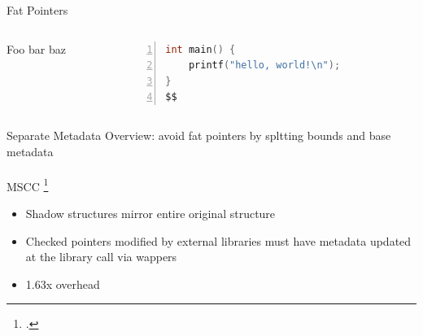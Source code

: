 \documentclass[aspectratio=169]{beamer}
\begin{document}
\begin{frame}[fragile]{Fat Pointers}
  \footnotesize
  \begin{columns}[T]
    \begin{column}{0.45\textwidth}
        Foo bar baz
    \end{column}
    \begin{column}{0.45\textwidth}
%      
       \begin{lstlisting}[language=C,numbers=left,mathescape,basicstyle={\footnotesize\ttfamily}]
int main() {
    printf("hello, world!\n");
}
$$
        \end{lstlisting}
    \end{column}
  \end{columns}
\end{frame}


\begin{frame}[fragile]{Separate Metadata}
Overview: avoid fat pointers by spltting bounds and base metadata
\\
\\
MSCC \footcite{xu_efficient_2004}
    \begin{itemize}
        \item Shadow structures mirror entire original structure
        \item Checked pointers modified by external libraries must have metadata updated at the library call via wappers
        \item 1.63x overhead
    \end{itemize}
\end{frame}
\end{document}
